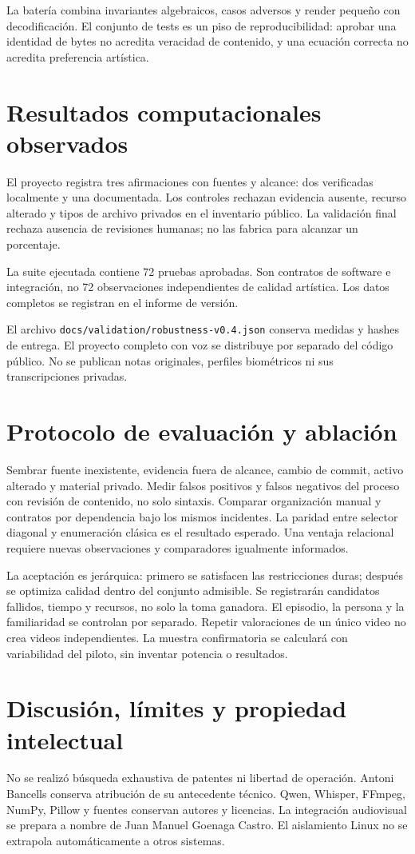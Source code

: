 \documentclass[10pt,a4paper]{article}
\begin{document}
La batería combina invariantes algebraicos, casos adversos y render pequeño con decodificación. El conjunto de tests es un piso de reproducibilidad: aprobar una identidad de bytes no acredita veracidad de contenido, y una ecuación correcta no acredita preferencia artística.
\section{Resultados computacionales observados}
El proyecto registra tres afirmaciones con fuentes y alcance: dos verificadas localmente y una documentada. Los controles rechazan evidencia ausente, recurso alterado y tipos de archivo privados en el inventario público. La validación final rechaza ausencia de revisiones humanas; no las fabrica para alcanzar un porcentaje.

La suite ejecutada contiene 72 pruebas aprobadas. Son contratos de software e integración, no 72 observaciones independientes de calidad artística. Los datos completos se registran en el informe de versión.

El archivo \texttt{docs/validation/robustness-v0.4.json} conserva medidas y hashes de entrega. El proyecto completo con voz se distribuye por separado del código público. No se publican notas originales, perfiles biométricos ni sus transcripciones privadas.
\section{Protocolo de evaluación y ablación}
Sembrar fuente inexistente, evidencia fuera de alcance, cambio de commit, activo alterado y material privado. Medir falsos positivos y falsos negativos del proceso con revisión de contenido, no solo sintaxis. Comparar organización manual y contratos por dependencia bajo los mismos incidentes. La paridad entre selector diagonal y enumeración clásica es el resultado esperado. Una ventaja relacional requiere nuevas observaciones y comparadores igualmente informados.

La aceptación es jerárquica: primero se satisfacen las restricciones duras; después se optimiza calidad dentro del conjunto admisible. Se registrarán candidatos fallidos, tiempo y recursos, no solo la toma ganadora. El episodio, la persona y la familiaridad se controlan por separado. Repetir valoraciones de un único video no crea videos independientes. La muestra confirmatoria se calculará con variabilidad del piloto, sin inventar potencia o resultados.
\section{Discusión, límites y propiedad intelectual}
No se realizó búsqueda exhaustiva de patentes ni libertad de operación. Antoni Bancells conserva atribución de su antecedente técnico. Qwen, Whisper, FFmpeg, NumPy, Pillow y fuentes conservan autores y licencias. La integración audiovisual se prepara a nombre de Juan Manuel Goenaga Castro. El aislamiento Linux no se extrapola automáticamente a otros sistemas.
\end{document}
